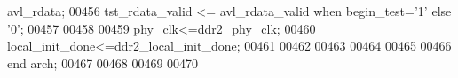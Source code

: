 \begin{DoxyCode}
{      avl_rdata};
00456 \textcolor{vhdlchar}{tst_rdata_valid}     \textcolor{vhdlchar}{<=} \textcolor{vhdlchar}{avl_rdata_valid} \textcolor{keywordflow}{when} \textcolor{vhdlchar}{begin_test}\textcolor{vhdlchar}{=}\textcolor{vhdlchar}{'}\textcolor{vhdllogic}{}\textcolor{vhdllogic}{1}\textcolor{vhdlchar}{'} \textcolor{keywordflow}{else} \textcolor{vhdlchar}{'}\textcolor{vhdllogic}{}\textcolor{vhdllogic}{0}\textcolor{vhdlchar}{'};
00457 
00458 
00459 \textcolor{vhdlchar}{phy_clk}\textcolor{vhdlchar}{<=}\textcolor{vhdlchar}{ddr2_phy_clk};
00460 local\_init\_done<=ddr2\_local\_init\_done;
00461 
00462 
00463 
00464 
00465   
00466 \textcolor{keywordflow}{end} \textcolor{vhdlchar}{arch};   
00467 
00468 
00469 
00470 
\end{DoxyCode}
